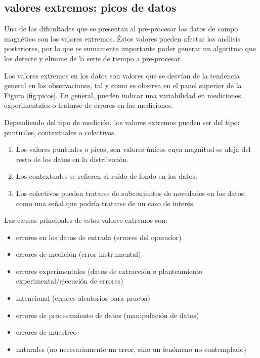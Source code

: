 \subsection{valores extremos: picos de datos}
Una de las dificultades que se presentan al pre-procesar los datos de campo magnético son los valores extremos. Éstos valores pueden afectar los análisis posteriores, por lo que es sumamente importante poder generar un algoritmo que los detecte y elimine de la serie de tiempo a pre-procesar.
\vspace{1 em}

Los valores extremos en los datos son valores que se desvían de la tendencia general en las observaciones, tal y como se observa en el panel superior de la Figura \ref{fig:picos}. En general, pueden indicar una variabilidad en mediciones experimentales o tratarse de errores en las mediciones\cite{brief_overview_outlier-detection}.
\vspace{1 em}

Dependiendo del tipo de medición, los valores extremos pueden ser del tipo: puntuales, contextuales o colectivos. 

\begin{enumerate}
    \item Los valores puntuales o picos, son valores únicos cuya magnitud se aleja del resto de los datos en la distribución.
    \item Los contextuales se refieren al ruido de fondo en los datos.
    \item Los colectivos pueden tratarse de subconjuntos de novedades en los datos, como una señal que podría tratarse de un caso de interés.
\end{enumerate}

Las causas principales de estos valores extremos son:
\begin{itemize}
    \item errores en los datos de entrada (errores del operador)
    \item errores de medición (error instrumental)
    \item errores experimentales (datos de extracción o planteamiento experimental/ejecución de errores)
    \item intencional (errores aleatorios para prueba)
    \item errores de procesamiento de datos (manipulación de datos)
    \item errores de muestreo
    \item naturales (no necesariamente un error, sino un fenómeno no contemplado)
\end{itemize}

